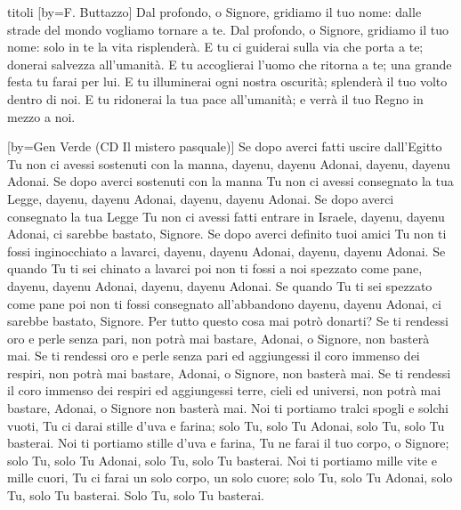 \begin{songs}{titoli}
[by={F. Buttazzo}]
\beginchorus
Dal profondo, o Signore, gridiamo il tuo nome:
dalle strade del mondo vogliamo tornare a te.
Dal profondo, o Signore, gridiamo il tuo nome:
solo in te la vita risplenderà.
\endchorus
\beginverse
E tu ci guiderai sulla via che porta a te;
donerai salvezza all'umanità.
\endverse
\beginverse
E tu accoglierai l'uomo che ritorna a te;
una grande festa tu farai per lui.
\endverse
\beginverse
E tu illuminerai ogni nostra oscurità;
splenderà il tuo volto dentro di noi.
\endverse
\beginverse
E tu ridonerai la tua pace all'umanità;
e verrà il tuo Regno in mezzo a noi.
\endverse
\endsong

[by={Gen Verde (CD Il mistero pasquale)}]
\beginverse
Se dopo averci fatti uscire dall'Egitto
Tu non ci avessi sostenuti con la manna,
dayenu, dayenu Adonai,
dayenu, dayenu Adonai.
Se dopo averci sostenuti con la manna
Tu non ci avessi consegnato la tua Legge,
dayenu, dayenu Adonai,
dayenu, dayenu Adonai.
Se dopo averci consegnato la tua Legge
Tu non ci avessi fatti entrare in Israele,
dayenu, dayenu Adonai,
ci sarebbe bastato, Signore.
\endverse
\beginverse
Se dopo averci definito tuoi amici
Tu non ti fossi inginocchiato a lavarci,
dayenu, dayenu Adonai,
dayenu, dayenu Adonai.
Se quando Tu ti sei chinato a lavarci
poi non ti fossi a noi spezzato come pane,
dayenu, dayenu Adonai,
dayenu, dayenu Adonai.
Se quando Tu ti sei spezzato come pane
poi non ti fossi consegnato all'abbandono
dayenu, dayenu Adonai,
ci sarebbe bastato, Signore.
\endverse
\beginverse
Per tutto questo cosa mai potrò donarti?
Se ti rendessi oro e perle senza pari,
non potrà mai bastare, Adonai,
o Signore, non basterà mai.
Se ti rendessi oro e perle senza pari
ed aggiungessi il coro immenso dei respiri,
non potrà mai bastare, Adonai,
o Signore, non basterà mai.
Se ti rendessi il coro immenso dei respiri
ed aggiungessi terre, cieli ed universi,
non potrà mai bastare, Adonai,
o Signore non basterà mai.
\endverse
\beginverse
Noi ti portiamo tralci spogli e solchi vuoti,
Tu ci darai stille d'uva e farina;
solo Tu, solo Tu Adonai,
solo Tu, solo Tu basterai.
Noi ti portiamo stille d'uva e farina,
Tu ne farai il tuo corpo, o Signore;
solo Tu, solo Tu Adonai,
solo Tu, solo Tu basterai.
Noi ti portiamo mille vite e mille cuori,
Tu ci farai un solo corpo, un solo cuore;
solo Tu, solo Tu Adonai,
solo Tu, solo Tu basterai.
Solo Tu, solo Tu basterai.
\endverse
\endsong


\end{songs}
